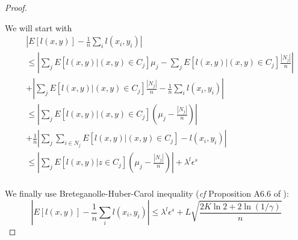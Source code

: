 \documentclass{article}
\begin{document}
\begin{proof}
\begin{small}
We will start with
\[
\begin{aligned}
&\left|E[l(x,y)] - \frac{1}{n}\sum_i l(x_i,y_i) \right| \\
&\leq \left|\sum_{j} E[l(x,y)| (x,y) \in C_j] \mu_{j} -  \sum_{j} E[l(x,y)| (x,y) \in C_j] \frac{|N_j|}{n} \right| \\
 &+  \left|\sum_{j} E[l(x,y)| (x,y) \in C_j] \frac{|N_j|}{n}  - \frac{1}{n}\sum_i l(x_i,y_i)\right| \\
  &\leq\left|\sum_{j} E[l(x,y)| (x,y) \in C_j] (\mu_{j} -   \frac{|N_j|}{n}) \right|\\
 &+\frac{1}{n} \left|\sum_j \sum_{i \in N_j} E[l(x,y)| (x,y) \in C_j]  - l(x_i,y_i)\right| \\
   &\leq \left|\sum_{j} E[l(x,y)|z \in C_j] (\mu_{j} -   \frac{|N_j|}{n})\right| + \lambda^l \epsilon^s  \\
 \end{aligned}
\]
\end{small}
We finally use Breteganolle-Huber-Carol inequality (\emph{cf} Proposition A6.6 of \cite{wellner}):
\[
\left| E[l(x,y)] - \frac{1}{n}\sum_i l(x_i,y_i) \right| \leq \lambda^l \epsilon^s + L \sqrt{\frac{2K\ln 2 + 2\ln (1/\gamma)}{n}}
\]
\end{proof}
\end{document}
